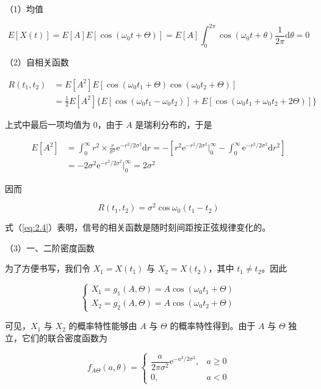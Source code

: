 \documentclass[11pt,openany,UTF8]{ctexbook}
\newcommand{\dif}{\mathrm{d}}                      %
\newcommand{\eu}{\mathrm{e}}                       %
\begin{document}
（1\nobreak）均值

\begin{equation}
E[X(t)] = E[A]E[\cos(\omega_0 t+\Theta)]
  = E[A]\int_0^{2\pi}\cos(\omega_0 t+\theta)\frac{1}{2\pi}\dif\theta = 0
\label{eq:2.3}
\end{equation}

（2\nobreak）自相关函数

\[
\begin{aligned}
R(t_1,t_2) &= E[A^2]E[\cos(\omega_0 t_1+\Theta)\cos(\omega_0 t_2+\Theta)]\\
&= \frac{1}{2}E[A^2]\bigl\{E[\cos(\omega_0 t_1-\omega_0 t_2)]
   + E[\cos(\omega_0 t_1+\omega_0 t_2+2\Theta)]\bigr\}
\end{aligned}
\]

上式中最后一项均值为 0\nobreak，由于 $A$ 是瑞利分布的\nobreak，于是

\[
\begin{aligned}
E[A^2] &= \int_0^{\infty} r^2\times\frac{r}{\sigma^2}\eu^{-r^2/2\sigma^2}\dif r
  = -\left[r^2\eu^{-r^2/2\sigma^2}\Big|_0^{\infty}
  - \int_0^{\infty}\eu^{-r^2/2\sigma^2}\dif r^2\right]\\
&= -2\sigma^2\eu^{-r^2/2\sigma^2}\Big|_0^{\infty} = 2\sigma^2
\end{aligned}
\]

因而

\begin{equation}
R(t_1,t_2) = \sigma^2\cos\omega_0(t_1-t_2)
\label{eq:2.4}
\end{equation}

式（\ref{eq:2.4}\nobreak）表明\nobreak，信号的相关函数是随时刻间距按正弦规律变化的\nobreak。

（3\nobreak）一\nobreak、二阶密度函数

为了方便书写\nobreak，我们令 $X_1 = X(t_1)$ 与 $X_2 = X(t_2)$\nobreak，其中 $t_1\ne t_2$\nobreak。因此

\[
\begin{cases}
X_1 = g_1(A,\Theta) = A\cos(\omega_0 t_1+\Theta)\\[2pt]
X_2 = g_2(A,\Theta) = A\cos(\omega_0 t_2+\Theta)
\end{cases}
\]

可见\nobreak，$X_1$ 与 $X_2$ 的概率特性能够由 $A$ 与 $\Theta$ 的概率特性得到\nobreak。由于 $A$ 与
$\Theta$ 独立\nobreak，它们的联合密度函数为

\[
f_{A\Theta}(a,\theta) =
\begin{cases}
\dfrac{a}{2\pi\sigma^2}\eu^{-a^2/2\sigma^2}, & a\geqslant 0\\[8pt]
0, & a<0
\end{cases}
\]
\end{document}
